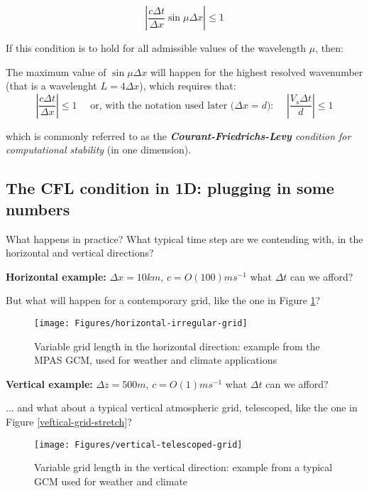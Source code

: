 	\begin{equation}
		\left | \frac {c \Delta t}{\Delta x} \sin \mu \Delta x \right | \leq 1
	\end{equation}	
	
	If this condition is to hold for all admissible values of the wavelength $\mu$, then:
	
	
	\begin{theorem}		
	The maximum value of $\sin \mu \Delta x$ will happen for the highest resolved wavenumber (that is a wavelenght $L=4 \Delta x$), which requires that:
	\begin{equation}
		\left | \frac {c \Delta t}{\Delta x}  \right | \leq 1       \textrm{  ~~  or, with the notation used later ($\Delta x = d$): ~~ } \left | \frac {V_s \Delta t}{d}  \right | \leq 1 
	\end{equation}	
	\end{theorem}

	which is commonly referred to as the \emph{\textbf{Courant-Friedrichs-Levy} condition for computational stability} (in one dimension).

\subsection{The CFL condition in 1D: plugging in some numbers}

What happens in practice? What typical time step are we contending with, in the horizontal and vertical directions?

	{\bf Horizontal example:} $\Delta x = 10km$, $c = O(100) ms^{-1}$ what $\Delta t$ can we afford?
		
	But what will happen for a contemporary grid, like the one in Figure  \ref{horizontal-grid-stretch}?	
	\begin{figure}[h!]
			\begin{center}
		\texttt{[image: Figures/horizontal-irregular-grid]}
		\end{center}
		\caption{Variable grid length in the horizontal direction: example from the MPAS GCM, used for weather and climate applications}
			\label{horizontal-grid-stretch}
	\end{figure}

{\bf Vertical example:} $\Delta z = 500m$, $c = O(1) ms^{-1}$ what $\Delta t$ can we afford?

... and what about a typical vertical atmospheric grid, telescoped, like the one in Figure \ref{veftical-grid-stretch}?
\begin{figure}[h!]
	\begin{center}
	\texttt{[image: Figures/vertical-telescoped-grid]}
	\end{center}
	\caption{Variable grid length in the vertical direction: example from a typical GCM used for weather and climate}
	\label{vertical-grid-stretch}
\end{figure}

